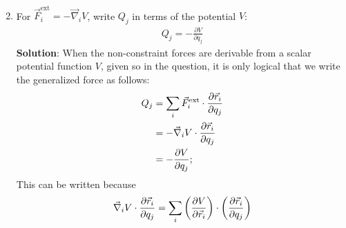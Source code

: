 \begin{enumerate}
\begin{align}
    \end{align}\bigskip
    \hline\hline\bigskip
    \item For $\vec{F}_i^{\text{ext}} = -\vec{\nabla}_i V$, write $Q_j$ in terms of the potential $V$:
    \begin{align*}
    Q_j = -\frac{\partial V}{\partial q_j}
    \end{align*}\bigskip
    \hline\hline\bigskip
     \textbf{Solution}: When the non-constraint forces are derivable from a scalar potential function $V$, given so in the question, it is only logical that we write the generalized force as follows:
     \begin{align*}
        Q_j &= \sum_i\vec{F}_i^{\text{ext}}\cdot\frac{\partial\vec{r}_i}{\partial q_j}\notag\\
        &=-\vec{\nabla}_iV\cdot\frac{\partial\vec{r}_i}{\partial q_j}\\
        &=-\frac{\partial V}{\partial q_j};
    \end{align*}
    This can be written because
    \begin{align}
        \vec{\nabla}_iV\cdot\frac{\partial\vec{r}_i}{\partial q_j}&=\sum_i\left(\frac{\partial V}{\partial\vec{r}_i}\right)\cdot\left(\frac{\partial\vec{r}_i}{\partial q_j}\right)\notag\\

\end{align}
\end{enumerate}
